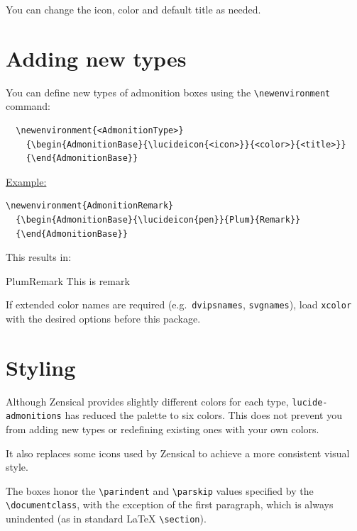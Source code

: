 \documentclass{scrartcl}
\newenvironment{AdmonitionRemark}
  {\begin{AdmonitionBase}{\lucideicon{pen}}{Plum}{Remark}}
  {\end{AdmonitionBase}}
\begin{document}
You can change the icon, color and default title as needed.


\section{Adding new types}

You can define new types of admonition boxes using the \verb|\newenvironment|
command:

\begin{verbatim}
  \newenvironment{<AdmonitionType>}
    {\begin{AdmonitionBase}{\lucideicon{<icon>}}{<color>}{<title>}}
    {\end{AdmonitionBase}}
\end{verbatim}

\underline{Example:}

\begin{verbatim}
\newenvironment{AdmonitionRemark}
  {\begin{AdmonitionBase}{\lucideicon{pen}}{Plum}{Remark}}
  {\end{AdmonitionBase}}
\end{verbatim}

This results in:

\begin{AdmonitionRemark}
This is remark
\end{AdmonitionRemark}

\begin{AdmonitionTip}
If extended color names are required (e.g.\ \texttt{dvipsnames},
\texttt{svgnames}), load \texttt{xcolor} with the desired options before
this package.
\end{AdmonitionTip}


\section{Styling}

Although Zensical provides slightly different colors for each type,
\texttt{lucide-admonitions} has reduced the palette to six colors. This does
not prevent you from adding new types or redefining existing ones with your
own colors.

It also replaces some icons used by Zensical to achieve a more consistent
visual style.

The boxes honor the \verb|\parindent| and \verb|\parskip| values specified by
the \verb|\documentclass|, with the exception of the first paragraph, which
is always unindented (as in standard \LaTeX{} \verb|\section|).
\end{document}
